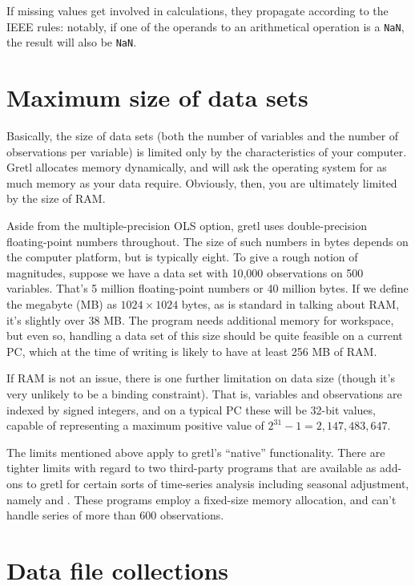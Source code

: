 If missing values get involved in calculations, they propagate
according to the IEEE rules: notably, if one of the operands to an
arithmetical operation is a \texttt{NaN}, the result will also be
\texttt{NaN}.
    
\section{Maximum size of data sets}
\label{data-limits}

Basically, the size of data sets (both the number of variables and the
number of observations per variable) is limited only by the
characteristics of your computer.  Gretl allocates memory
dynamically, and will ask the operating system for as much memory as
your data require.  Obviously, then, you are ultimately limited by the
size of RAM.

Aside from the multiple-precision OLS option, gretl uses
double-precision floating-point numbers throughout.  The size of such
numbers in bytes depends on the computer platform, but is typically
eight.  To give a rough notion of magnitudes, suppose we have a data
set with 10,000 observations on 500 variables.  That's 5 million
floating-point numbers or 40 million bytes.  If we define the megabyte
(MB) as $1024 \times 1024$ bytes, as is standard in talking about RAM,
it's slightly over 38 MB.  The program needs additional memory for
workspace, but even so, handling a data set of this size should be
quite feasible on a current PC, which at the time of writing is likely
to have at least 256 MB of RAM.  

If RAM is not an issue, there is one further limitation on data size
(though it's very unlikely to be a binding constraint).  That is,
variables and observations are indexed by signed integers, and on a
typical PC these will be 32-bit values, capable of representing
a maximum positive value of $2^{31} - 1 = 2,147,483,647$.

The limits mentioned above apply to gretl's ``native''
functionality.  There are tighter limits with regard to two
third-party programs that are available as add-ons to gretl for
certain sorts of time-series analysis including seasonal adjustment,
namely  and .  These programs employ
a fixed-size memory allocation, and can't handle series of more than
600 observations.


\section{Data file collections}
\label{collections}

